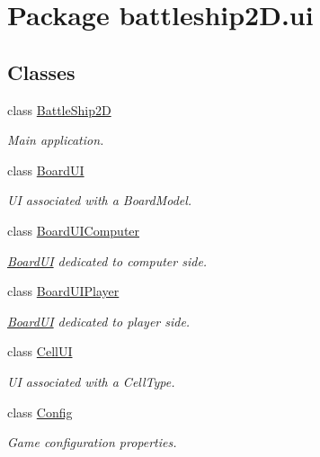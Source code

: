 \hypertarget{namespacebattleship2D_1_1ui}{\section{Package battleship2\-D.\-ui}
\label{namespacebattleship2D_1_1ui}
}
\subsection*{Classes}
\begin{DoxyCompactItemize}
\item 
class \hyperlink{classbattleship2D_1_1ui_1_1BattleShip2D}{Battle\-Ship2\-D}
\begin{DoxyCompactList}\small\item\em Main application. \end{DoxyCompactList}\item 
class \hyperlink{classbattleship2D_1_1ui_1_1BoardUI}{Board\-U\-I}
\begin{DoxyCompactList}\small\item\em U\-I associated with a Board\-Model. \end{DoxyCompactList}\item 
class \hyperlink{classbattleship2D_1_1ui_1_1BoardUIComputer}{Board\-U\-I\-Computer}
\begin{DoxyCompactList}\small\item\em \hyperlink{classbattleship2D_1_1ui_1_1BoardUI}{Board\-U\-I} dedicated to computer side. \end{DoxyCompactList}\item 
class \hyperlink{classbattleship2D_1_1ui_1_1BoardUIPlayer}{Board\-U\-I\-Player}
\begin{DoxyCompactList}\small\item\em \hyperlink{classbattleship2D_1_1ui_1_1BoardUI}{Board\-U\-I} dedicated to player side. \end{DoxyCompactList}\item 
class \hyperlink{classbattleship2D_1_1ui_1_1CellUI}{Cell\-U\-I}
\begin{DoxyCompactList}\small\item\em U\-I associated with a Cell\-Type. \end{DoxyCompactList}\item 
class \hyperlink{classbattleship2D_1_1ui_1_1Config}{Config}
\begin{DoxyCompactList}\small\item\em Game configuration properties. \end{DoxyCompactList}\item 

\end{DoxyCompactItemize}
